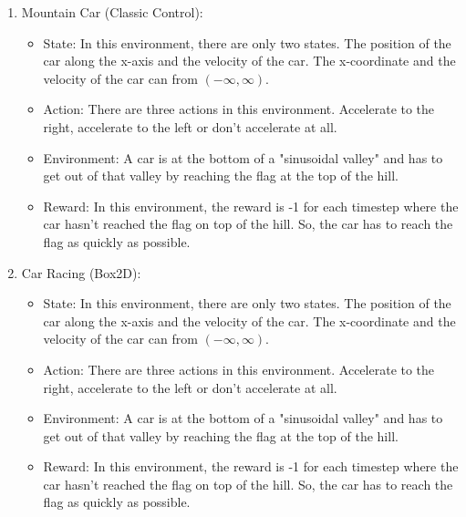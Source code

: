 \documentclass{article}
\numberwithin{equation}{section}
\numberwithin{equation}{section}
\begin{document}
\begin{enumerate}
\item Mountain Car (Classic Control):
\begin{itemize}
\item State: In this environment, there are only two states. The position of the car along the x-axis and the velocity of the car. The x-coordinate and the velocity of the car can from $\left(-\infty, \infty\right)$.
\item Action: There are three actions in this environment. Accelerate to the right, accelerate to the left or don't accelerate at all.  
\item Environment: A car is at the bottom of a "sinusoidal valley" and has to get out of that valley by reaching the flag at the top of the hill.
\item Reward: In this environment, the reward is -1 for each timestep where the car hasn't reached the flag on top of the hill. So, the car has to reach the flag as quickly as possible.  
\end{itemize}



\item Car Racing (Box2D): 
\begin{itemize}
\item State: In this environment, there are only two states. The position of the car along the x-axis and the velocity of the car. The x-coordinate and the velocity of the car can from $\left(-\infty, \infty\right)$.
\item Action: There are three actions in this environment. Accelerate to the right, accelerate to the left or don't accelerate at all.  
\item Environment: A car is at the bottom of a "sinusoidal valley" and has to get out of that valley by reaching the flag at the top of the hill.
\item Reward: In this environment, the reward is -1 for each timestep where the car hasn't reached the flag on top of the hill. So, the car has to reach the flag as quickly as possible.  
\end{itemize}

\end{enumerate}
\end{document}
